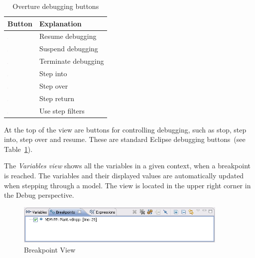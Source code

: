 \begin{table}
\begin{center}
\begin{tabular}{|l|l|}\hline \hline
\textbf{Button} & \textbf{Explanation} \\ \hline
\includegraphics[width=0.03\textwidth]{figures/resume} & Resume debugging \\
\includegraphics[width=0.03\textwidth]{figures/suspend} & Suspend debugging\\
\includegraphics[width=0.03\textwidth]{figures/terminate} & Terminate debugging\\
\includegraphics[width=0.03\textwidth]{figures/stepinto} & Step into\\
\includegraphics[width=0.03\textwidth]{figures/stepover} & Step over \\
\includegraphics[width=0.03\textwidth]{figures/stepreturn} & Step return\\
\includegraphics[width=0.03\textwidth]{figures/stepbystep} & Use step filters\\
\hline \hline
\end{tabular}
\caption{Overture debugging buttons\label{tab:debugButtons}}
\end{center}
\end{table}

At the top of the view are buttons for controlling debugging, such as stop, step into, step over and resume. These are standard Eclipse debugging buttons~(see Table~\ref{tab:debugButtons}).

The \emph{Variables view} shows all the variables in a given context, when a breakpoint is reached. The variables and their displayed values are automatically updated when stepping through a model. The view is located in the upper right corner in the Debug perspective.
%
\begin{figure}[htp]
\begin{center}
  \includegraphics[width=4in]{figures/BreakpointView}
  \caption{Breakpoint View}
  \label{fig:BreakpointView}
\end{center}
\end{figure}
%

